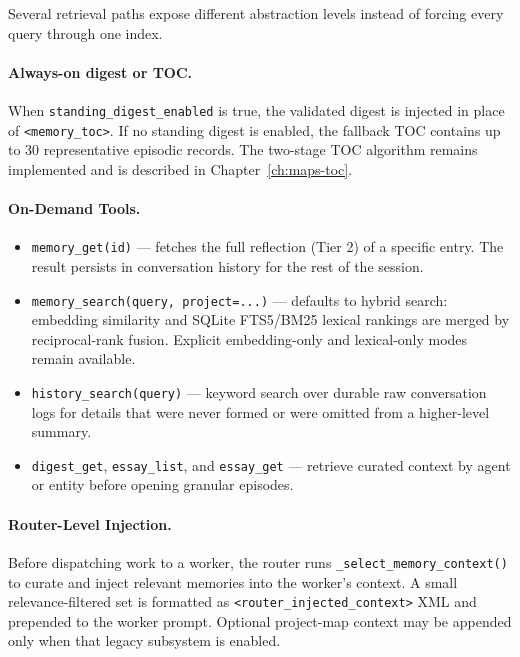 \documentclass[11pt,letterpaper]{report}
\newcommand{\code}[1]{\texttt{#1}}
\begin{document}
Several retrieval paths expose different abstraction levels instead of
forcing every query through one index.

\paragraph{Always-on digest or TOC.}
When \code{standing\_digest\_enabled} is true, the validated digest is
injected in place of \code{<memory\_toc>}. If no standing digest is enabled,
the fallback TOC contains up to 30 representative episodic records. The
two-stage TOC algorithm remains implemented and is described in
Chapter~\ref{ch:maps-toc}.

\paragraph{On-Demand Tools.}
\begin{itemize}[nosep]
  \item \code{memory\_get(id)} --- fetches the full reflection (Tier 2)
        of a specific entry. The result persists in conversation history
        for the rest of the session.
  \item \code{memory\_search(query, project=...)} --- defaults to hybrid
        search: embedding similarity and SQLite FTS5/BM25 lexical rankings
        are merged by reciprocal-rank fusion. Explicit embedding-only and
        lexical-only modes remain available.
  \item \code{history\_search(query)} --- keyword search over durable raw
        conversation logs for details that were never formed or were omitted
        from a higher-level summary.
  \item \code{digest\_get}, \code{essay\_list}, and \code{essay\_get} ---
        retrieve curated context by agent or entity before opening granular
        episodes.
\end{itemize}

\paragraph{Router-Level Injection.}
Before dispatching work to a worker, the router runs
\code{\_select\_memory\_context()} to curate and inject relevant
memories into the worker's context. A small relevance-filtered set is
formatted as \code{<router\_injected\_context>} XML and prepended to the
worker prompt. Optional project-map context may be appended only when that
legacy subsystem is enabled.
\end{document}
